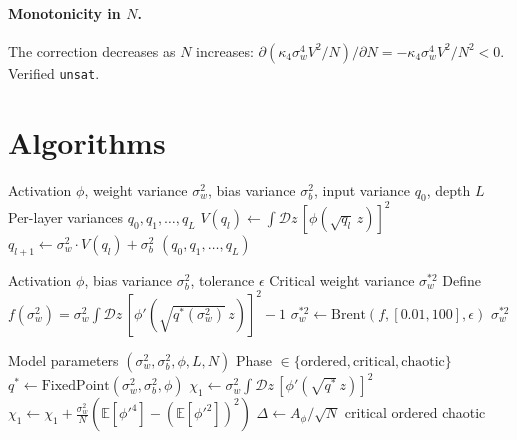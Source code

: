 \documentclass[10pt]{article}
\newcommand{\EE}{\mathbb{E}}
\begin{document}
\paragraph{Monotonicity in $N$.}
The correction decreases as $N$ increases: $\partial(\kappa_4 \sigma_w^4 V^2/N)/\partial N = -\kappa_4 \sigma_w^4 V^2/N^2 < 0$.
Verified \texttt{unsat}.
\section{Algorithms}
\label{app:algorithms}

\begin{algorithm}[H]
\caption{Variance Map Computation}
\label{alg:variance-map}
\begin{algorithmic}[1]
\Require Activation $\phi$, weight variance $\sigma_w^2$, bias variance $\sigma_b^2$, input variance $q_0$, depth $L$
\Ensure Per-layer variances $q_0, q_1, \ldots, q_L$
    \State $V(q_l) \gets \int \mathcal{D}z\, [\phi(\sqrt{q_l}\, z)]^2$ 
    \State $q_{l+1} \gets \sigma_w^2 \cdot V(q_l) + \sigma_b^2$
\EndFor
\State \Return $(q_0, q_1, \ldots, q_L)$
\end{algorithmic}
\end{algorithm}

\begin{algorithm}[H]
\caption{Edge-of-Chaos Solver}
\label{alg:eoc-solver}
\begin{algorithmic}[1]
\Require Activation $\phi$, bias variance $\sigma_b^2$, tolerance $\epsilon$
\Ensure Critical weight variance $\sigma_w^{*2}$
\State Define $f(\sigma_w^2) = \sigma_w^2 \int \mathcal{D}z\, [\phi'(\sqrt{q^*(\sigma_w^2)}\, z)]^2 - 1$
\State $\sigma_w^{*2} \gets \text{Brent}(f, [0.01, 100], \epsilon)$
\State \Return $\sigma_w^{*2}$
\end{algorithmic}
\end{algorithm}

\begin{algorithm}[H]
\caption{Phase Classification}
\label{alg:classify}
\begin{algorithmic}[1]
\Require Model parameters $(\sigma_w^2, \sigma_b^2, \phi, L, N)$
\Ensure Phase $\in \{\text{ordered}, \text{critical}, \text{chaotic}\}$
\State $q^* \gets \text{FixedPoint}(\sigma_w^2, \sigma_b^2, \phi)$
\State $\chi_1 \gets \sigma_w^2 \int \mathcal{D}z\, [\phi'(\sqrt{q^*}\, z)]^2$
    \State $\chi_1 \gets \chi_1 + \frac{\sigma_w^2}{N}(\EE[\phi'^4] - (\EE[\phi'^2])^2)$ 
\EndIf
\State $\Delta \gets A_\phi / \sqrt{N}$ 
    \State \Return critical
    \State \Return ordered
\Else
    \State \Return chaotic
\EndIf
\end{algorithmic}
\end{algorithm}
\end{document}
